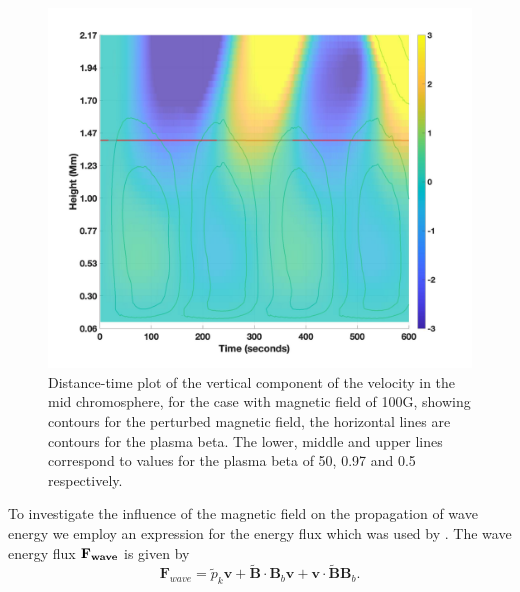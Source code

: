 \documentclass[linenumbers]{aastex63}
\begin{document}
\begin{figure}
\centering
\label{td_vert_bv100G_300_with_bandbeta}
\includegraphics[scale=0.25]{td_vert_bv100G_300_with_bandbeta.jpg}
\caption{Distance-time plot of the vertical component of the velocity in the mid chromosphere, for the case with magnetic field of 100G, showing  contours for the perturbed magnetic field, the horizontal lines are contours for the plasma beta. The lower, middle and upper lines correspond to values for the plasma beta of 50, 0.97 and 0.5 respectively.}
\end{figure}



To investigate the influence of the magnetic field on the propagation of wave energy we employ an expression for the energy flux which was used by \citet{Bogdan2003}. The wave energy flux $\bf{F}_{wave}$ is given by
$$
{\mathbf F}_{wave}=\tilde{p}_{k} {\mathbf v}+\tilde{\mathbf B}\cdot {\mathbf B_{b}}{\mathbf v}+{\mathbf v}\cdot \tilde{\mathbf B}{\mathbf B_{b}} .
$$
\end{document}
